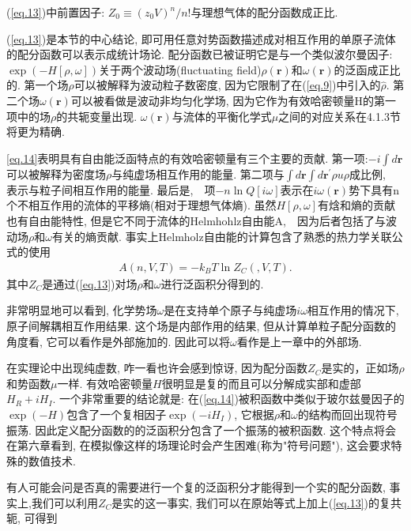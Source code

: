 (\ref{eq.13})中前置因子: $Z_0\equiv(z_0V)^{n}/{n!}$与理想气体的配分函数成正比.
\par
(\ref{eq.13})是本节的中心结论,
即可用任意対势函数描述成对相互作用的单原子流体的配分函数可以表示成统计场论.
配分函数已被证明它是与一个类似波尔曼因子: $\exp(-H[\rho,
\omega])$关于两个波动场(fluctuating field)$\rho(\bm{r})$和$\omega(\bm{r})$的泛函成正比的.
第一个场$\rho$可以被解释为波动粒子数密度,
因为它限制了在(\ref{eq.9})中引入的$\hat{\rho}$.
第二个场$\omega(\bm{r})$可以被看做是波动非均匀化学场,
因为它作为有效哈密顿量H的第一项中的场$\rho$的共轭变量出现.
$\omega(\bm{r})$与流体的平衡化学式$\mu$之间的对应关系在4.1.3节将更为精确.
\par
\ref{eq.14}表明具有自由能泛函特点的有效哈密顿量有三个主要的贡献. 第一项:$-i\int
d\bm{r}$可以被解释为密度场$\rho$与纯虚场相互作用的能量. 第二项与$\int d\bm{r}
\int d\bm{r^{'}} \rho u \rho$成比例,　表示与粒子间相互作用的能量.
最后是,　项$-n\ln
Q[i\omega]$表示在$i\omega(\bm{r})$势下具有n个不相互作用的流体的平移熵(相对于理想气体熵).
虽然$H[\rho, \omega]$有焓和熵的贡献也有自由能特性,
但是它不同于流体的Helmhohlz自由能A,　因为后者包括了与波动场$\rho$和$\omega$有关的熵贡献.
事实上Helmholz自由能的计算包含了熟悉的热力学关联公式的使用
\label{subsec.equations}
   \begin{equation}
       \begin{aligned}
           A(n, V, T)=-k_BT \ln Z_C(, V, T).
       \end{aligned}
       \label{eq.15}
    \end{equation}
其中$Z_C$是通过(\ref{eq.13})对场$\rho$和$\omega$进行泛函积分得到的.
\par
非常明显地可以看到,
化学势场$\omega$是在支持单个原子与纯虚场$i\omega$相互作用的情况下, 原子间解耦相互作用结果.
这个场是内部作用的结果, 但从计算单粒子配分函数的角度看, 它可以看作是外部施加的.
因此可以将$\omega$看作是上一章中的外部场.
\par
在实理论中出现纯虚数, 咋一看也许会感到惊讶,
因为配分函数$Z_C$是实的，正如场$\rho$和势函数$\mu$一样.
有效哈密顿量$H$很明显是复的而且可以分解成实部和虚部$H_R+iH_I$.
一个非常重要的结论就是:
在(\ref{eq.14})被积函数中类似于玻尔兹曼因子的$\exp(-H)$包含了一个复相因子$\exp(-iH_I)$,
它根据$\rho$和$\omega$的结构而回出现符号振荡.
因此定义配分函数的的泛函积分包含了一个振荡的被积函数. 这个特点将会在第六章看到,
在模拟像这样的场理论时会产生困难(称为"符号问题"), 这会要求特殊的数值技术.
\par
有人可能会问是否真的需要进行一个复的泛函积分才能得到一个实的配分函数,
事实上,我们可以利用$Z_C$是实的这一事实,
我们可以在原始等式上加上(\ref{eq.13})的复共轭, 可得到
